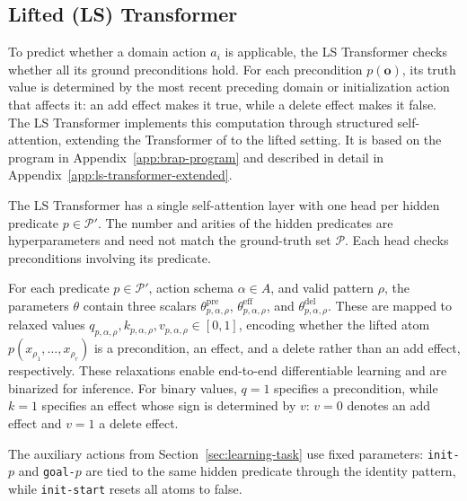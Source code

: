 \subsection{Lifted \strips (LS) Transformer}
\label{sec:ls-transformer}

To predict whether a domain action $a_i$ is applicable, the LS Transformer checks whether all its ground preconditions hold. For each precondition $p(\mathbf{o})$, its truth value is determined by the most recent preceding domain or initialization action that affects it: an add
effect makes it true, while a delete effect makes it false.
The LS Transformer implements this computation through structured self-attention, extending the \strips Transformer of \citet{nunez2026strips} to the lifted setting. It is based on the \brasp program in
Appendix~\ref{app:brap-program} and described in detail in
Appendix~\ref{app:ls-transformer-extended}.

The LS Transformer has a single self-attention layer with one head per hidden predicate $p\in\mathcal{P}'$.
The number and arities of the hidden predicates are hyperparameters and need not match the ground-truth set $\mathcal{P}$. Each head checks preconditions involving its predicate.

For each predicate $p\in\mathcal{P}'$, action schema $\alpha\in A$, and valid pattern $\rho$, the parameters $\theta$ contain three scalars
$\theta^{\mathrm{pre}}_{p,\alpha,\rho}$,
$\theta^{\mathrm{eff}}_{p,\alpha,\rho}$, and
$\theta^{\mathrm{del}}_{p,\alpha,\rho}$.
These are mapped to relaxed values
$q_{p,\alpha,\rho},k_{p,\alpha,\rho},v_{p,\alpha,\rho}\in[0,1]$,
encoding whether the lifted atom $p(x_{\rho_1},\ldots,x_{\rho_r})$ is a precondition, an effect, and a delete rather than an add effect, respectively. These relaxations enable end-to-end differentiable learning and are binarized for inference. For binary values, $q=1$ specifies a precondition, while $k=1$ specifies an effect whose sign is determined by $v$: $v=0$ denotes an add effect and $v=1$ a delete effect.

The auxiliary actions from Section~\ref{sec:learning-task} use fixed parameters: \texttt{init-}$p$ and \texttt{goal-}$p$ are tied to the same hidden
predicate through the identity pattern, while \texttt{init-start} resets all atoms to false.

